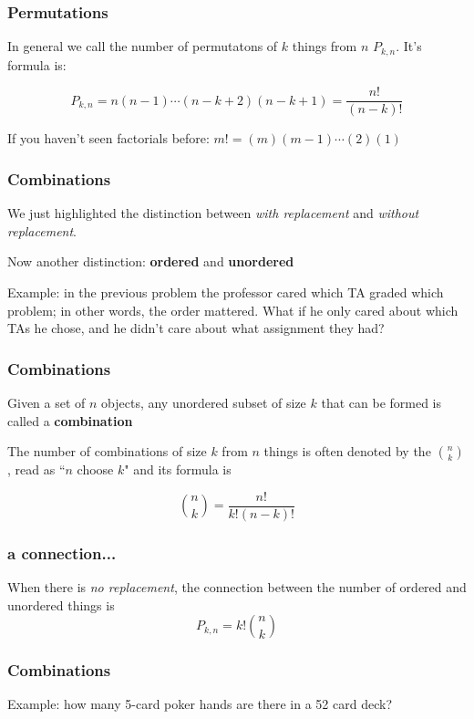 \documentclass{beamer}
\begin{document}
\begin{frame}
\frametitle{Permutations}

In general we call the number of permutatons of $k$ things from $n$ $P_{k,n}$. It's formula is:

\[
P_{k,n} = n(n-1)\cdots(n-k+2)(n-k+1) = \frac{n!}{(n-k)!}
\]

If you haven't seen factorials before: $m! = (m)(m-1)\cdots(2)(1)$
\end{frame}




\begin{frame}
\frametitle{Combinations}

We just highlighted the distinction between \emph{with replacement} and \emph{without replacement}.
\newline

Now another distinction: \textbf{ordered} and \textbf{unordered}
\newline

Example: in the previous problem the professor cared which TA graded which problem; in other words, the order mattered. What if he only cared about which TAs he chose, and he didn't care about what assignment they had?

\end{frame}



\begin{frame}
\frametitle{Combinations}

Given a set of $n$ objects, any unordered subset of size $k$ that can be formed is called a \textbf{combination}
\newline

The number of combinations of size $k$ from $n$ things is often denoted by the ${n \choose k}$, read as ``$n$ choose $k$" and its formula is 

\[
{n \choose k} = \frac{n!}{k!(n-k)!}
\]

\end{frame}


\begin{frame}
\frametitle{a connection...}

When there is \emph{no replacement}, the connection between the number of ordered and unordered things is 
\[
P_{k,n} = k! {n \choose k}
\]

\end{frame}


\begin{frame}
\frametitle{Combinations}

Example: how many 5-card poker hands are there in a 52 card deck?

\end{frame}

\end{document}
